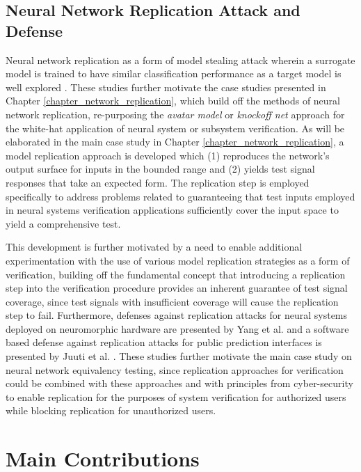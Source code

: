 \subsection{Neural Network Replication Attack and Defense}
Neural network replication as a form of model stealing attack wherein a surrogate model is trained to have similar classification performance as a target model is well explored \cite{tramer_stealing_2016,papernot_practical_2017,oh_reverse_2019,duddu_stealing_2018,orekondy_knockoff_2019}.  These studies further motivate the case studies presented in Chapter \ref{chapter_network_replication}, which build off the methods of neural network replication, re-purposing the \emph{avatar model} \cite{oh_reverse_2019} or \emph{knockoff net} \cite{orekondy_knockoff_2019} approach for the white-hat application of neural system or subsystem verification.  As will be elaborated in the main case study in Chapter \ref{chapter_network_replication}, a model replication approach is developed which (1) reproduces the network's output surface for inputs in the bounded range and (2) yields test signal responses that take an expected form.  The replication step is employed specifically to address problems related to guaranteeing that test inputs employed in neural systems verification applications sufficiently cover the input space to yield a comprehensive test.

This development is further motivated by a need to enable additional experimentation with the use of various model replication strategies as a form of verification, building off the fundamental concept that introducing a replication step into the verification procedure provides an inherent guarantee of test signal coverage, since test signals with insufficient coverage will cause the replication step to fail.  Furthermore, defenses against replication attacks for neural systems deployed on neuromorphic hardware are presented by Yang et al. \cite{yang_thwarting_2019} and a software based defense against replication attacks for public prediction interfaces is presented by Juuti et al. \cite{juuti_prada_2019}.  These studies further motivate the main case study on neural network equivalency testing, since replication approaches for verification could be combined with these approaches and with principles from cyber-security to enable replication for the purposes of system verification for authorized users while blocking replication for unauthorized users.

\section{Main Contributions}

